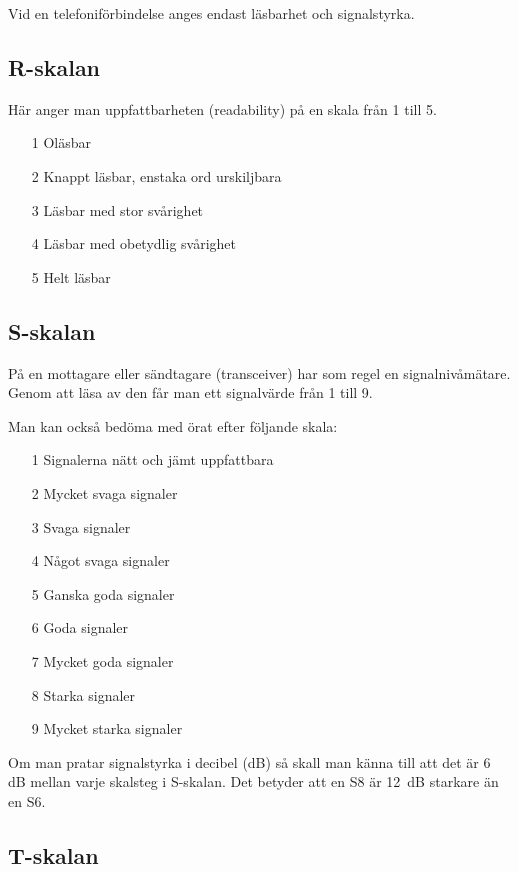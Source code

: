 Vid en telefoniförbindelse anges endast
läsbarhet och signalstyrka.

\subsection{R-skalan}

Här anger man uppfattbarheten (readability) på en skala från 1 till 5.

\begin{itemize}
	\item [1] Oläsbar
	\item [2] Knappt läsbar, enstaka ord urskiljbara
	\item [3] Läsbar med stor svårighet
	\item [4] Läsbar med obetydlig svårighet
	\item [5] Helt läsbar
\end{itemize}

\subsection{S-skalan}

På en mottagare eller sändtagare (transceiver) har som regel en signalnivåmätare. Genom att läsa av den får man ett signalvärde från 1 till 9.

Man kan också bedöma med örat efter följande skala:

\begin{itemize}
	\item [1] Signalerna nätt och jämt uppfattbara
	\item [2] Mycket svaga signaler
	\item [3] Svaga signaler
	\item [4] Något svaga signaler
	\item [5] Ganska goda signaler
	\item [6] Goda signaler
	\item [7] Mycket goda signaler
	\item [8] Starka signaler
	\item [9] Mycket starka signaler
\end{itemize}

Om man pratar signalstyrka i decibel (dB) så skall man känna till att det är 6 dB mellan varje skalsteg i S-skalan. Det betyder att en S8 är \SI{12}{dB} starkare än en S6.

\newpage

\subsection{T-skalan}

